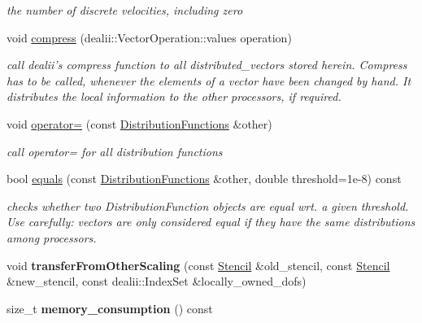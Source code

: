 \begin{DoxyCompactItemize}
\begin{DoxyCompactList}\small\item\em the number of discrete velocities, including zero \item\end{DoxyCompactList}\item 
void \hyperlink{classnatrium_1_1DistributionFunctions_a5b0afbafe841922dd3f949cc315b5533}{compress} (dealii::VectorOperation::values operation)
\begin{DoxyCompactList}\small\item\em call dealii's compress function to all distributed\_\-vectors stored herein. Compress has to be called, whenever the elements of a vector have been changed by hand. It distributes the local information to the other processors, if required. \item\end{DoxyCompactList}\item 
void \hyperlink{classnatrium_1_1DistributionFunctions_a5e61cb3ba258cf0958e1557061ed31b9}{operator=} (const \hyperlink{classnatrium_1_1DistributionFunctions}{DistributionFunctions} \&other)
\begin{DoxyCompactList}\small\item\em call operator= for all distribution functions \item\end{DoxyCompactList}\item 
bool \hyperlink{classnatrium_1_1DistributionFunctions_af7132264087f7000ffe8b191210b4552}{equals} (const \hyperlink{classnatrium_1_1DistributionFunctions}{DistributionFunctions} \&other, double threshold=1e-\/8) const 
\begin{DoxyCompactList}\small\item\em checks whether two DistributionFunction objects are equal wrt. a given threshold. Use carefully: vectors are only considered equal if they have the same distributions among processors. \item\end{DoxyCompactList}\item 
\hypertarget{classnatrium_1_1DistributionFunctions_a337f35635db75aaecfc7dde998e3321d}{
void {\bfseries transferFromOtherScaling} (const \hyperlink{classnatrium_1_1Stencil}{Stencil} \&old\_\-stencil, const \hyperlink{classnatrium_1_1Stencil}{Stencil} \&new\_\-stencil, const dealii::IndexSet \&locally\_\-owned\_\-dofs)}
\label{classnatrium_1_1DistributionFunctions_a337f35635db75aaecfc7dde998e3321d}

\item 
\hypertarget{classnatrium_1_1DistributionFunctions_a3942c2287df5372698ca987288a902e8}{
size\_\-t {\bfseries memory\_\-consumption} () const }
\label{classnatrium_1_1DistributionFunctions_a3942c2287df5372698ca987288a902e8}

\end{DoxyCompactItemize}


